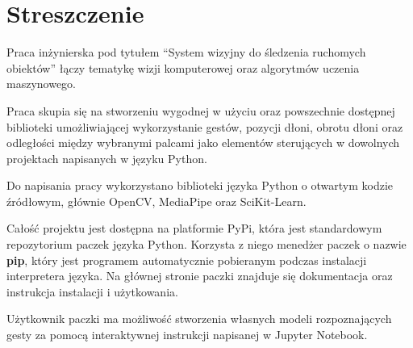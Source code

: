 \chapter{Streszczenie}



\quad Praca inżynierska pod tytułem \enquote{System wizyjny do śledzenia ruchomych obiektów} łączy tematykę wizji komputerowej oraz algorytmów uczenia maszynowego. 

\quad Praca skupia się na stworzeniu wygodnej w użyciu oraz powszechnie dostępnej biblioteki umożliwiającej wykorzystanie gestów, pozycji dłoni, obrotu dłoni oraz odległości między wybranymi palcami jako elementów sterujących w dowolnych projektach napisanych w języku Python. 

\quad Do napisania pracy wykorzystano biblioteki języka Python o otwartym kodzie źródłowym, głównie OpenCV, MediaPipe oraz SciKit-Learn. 

\quad Całość projektu jest dostępna na platformie PyPi, która jest standardowym repozytorium paczek języka Python. Korzysta z niego menedżer paczek o nazwie \textbf{pip}, który jest programem automatycznie pobieranym podczas instalacji interpretera języka. Na głównej stronie paczki znajduje się dokumentacja oraz instrukcja instalacji i użytkowania. 

\quad Użytkownik paczki ma możliwość stworzenia własnych modeli rozpoznających gesty za pomocą interaktywnej instrukcji napisanej w Jupyter Notebook. 



\pagestyle{NumeryStronNazwyRozdzialow}